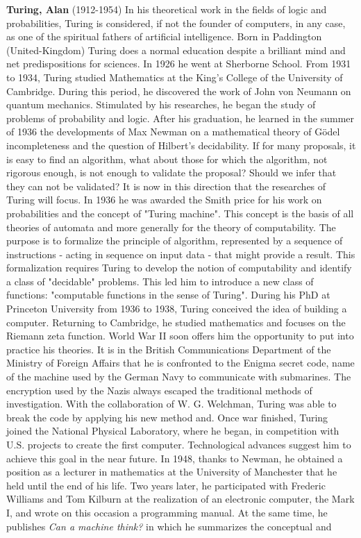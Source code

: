 \textbf{Turing, Alan} (1912-1954) In his theoretical work in the fields of logic and probabilities, Turing is considered, if not the founder of computers, in any case, as one of the spiritual fathers of artificial intelligence. Born in Paddington (United-Kingdom) Turing does a normal education despite a brilliant mind and net predispositions for sciences. In 1926 he went at Sherborne School. From 1931 to 1934, Turing studied Mathematics at the King's College of the University of Cambridge. During this period, he discovered the work of John von Neumann on quantum mechanics. Stimulated by his researches, he began the study of problems of probability and logic. After his graduation, he learned in the summer of 1936 the developments of Max Newman on a mathematical theory of Gödel incompleteness and the question of Hilbert's decidability. If for many proposals, it is easy to find an algorithm, what about those for which the algorithm, not rigorous enough, is not enough to validate the proposal? Should we infer that they can not be validated? It is now in this direction that the researches of Turing will focus. In 1936 he was awarded the Smith price for his work on probabilities and the concept of "Turing machine". This concept is the basis of all theories of automata and more generally for the theory of computability. The purpose is to formalize the principle of algorithm, represented by a sequence of instructions - acting in sequence on input data - that might provide a result. This formalization requires Turing to develop the notion of computability and identify a class of "decidable" problems. This led him to introduce a new class of functions: "computable functions in the sense of Turing". During his PhD at Princeton University from 1936 to 1938, Turing conceived the idea of building a computer. Returning to Cambridge, he studied mathematics and focuses on the Riemann zeta function. World War II soon offers him the opportunity to put into practice his theories. It is in the British Communications Department of the Ministry of Foreign Affairs that he is confronted to the Enigma secret code, name of the machine used by the German Navy to communicate with submarines. The encryption used by the Nazis always escaped the traditional methods of investigation. With the collaboration of W. G. Welchman, Turing was able to break the code by applying his new method and. Once war finished, Turing joined the National Physical Laboratory, where he began, in competition with U.S. projects to create the first computer. Technological advances suggest him to achieve this goal in the near future. In 1948, thanks to Newman, he obtained a position as a lecturer in mathematics at the University of Manchester that he held until the end of his life. Two years later, he participated with Frederic Williams and Tom Kilburn at the realization of an electronic computer, the Mark I, and wrote on this occasion a programming manual. At the same time, he publishes \textit{Can a machine think?} in which he summarizes the conceptual and 